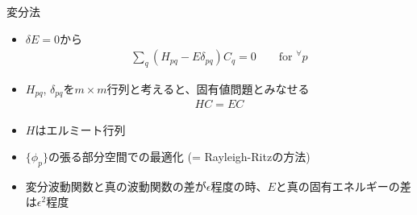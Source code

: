 
\begin{frame}[t,fragile]{変分法}
  \begin{itemize}
  \item $\delta E = 0$から
    \begin{align*}
      \sum_{q} (H_{pq} - E \delta_{pq} ) C_q = 0 \qquad \text{for $^\forall p$}
    \end{align*}
  \item $H_{pq}$, $\delta_{pq}$を$m \times m$行列と考えると、固有値問題とみなせる
    \begin{align*}
      H C = E C
    \end{align*}
  \item $H$はエルミート行列
  \item $\{ \phi_p \}$の張る部分空間での最適化 (= Rayleigh-Ritzの方法)
  \item 変分波動関数と真の波動関数の差が$\epsilon$程度の時、$E$と真の固有エネルギーの差は$\epsilon^2$程度
  \end{itemize}
\end{frame}

